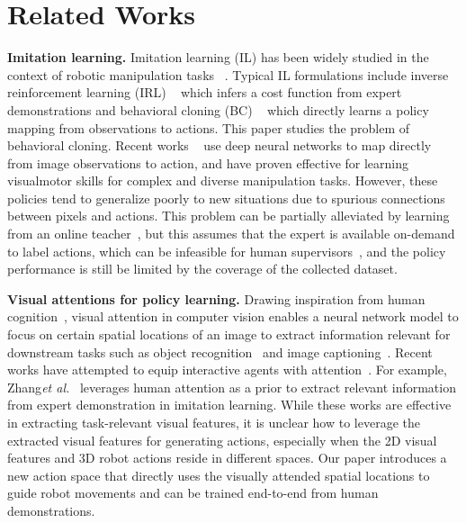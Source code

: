 \documentclass[letterpaper, 10 pt, conference]{ieeeconf}
\newcommand{\etal}{\xspace\emph{et al.}\xspace}
\begin{document}
\section{Related Works}

\textbf{Imitation learning.}
Imitation learning (IL) has been widely studied in the context of robotic manipulation tasks ~\cite{Ijspeert2002MovementIW, Schaal1999IsIL, Billard2008RobotPB, Calinon2010LearningAR, englert2018learning}. Typical IL formulations include inverse reinforcement learning (IRL) ~\cite{russell1998learning} which infers a cost function from expert demonstrations and behavioral cloning (BC) ~\cite{bain1995framework} which directly learns a policy mapping from observations to actions. This paper studies the problem of behavioral cloning. Recent works ~\cite{pomerleau1989alvinn, deep_imitation, Finn2017OneShotVI, mandlekar2020gti} use deep neural networks to map directly from image observations to action, and have proven effective for learning visualmotor skills for complex and diverse manipulation tasks. However, these policies tend to generalize poorly to new situations due to spurious connections between pixels and actions. This problem can be partially alleviated by learning from an online teacher~\cite{Ross2010ARO}, but this assumes that the expert is available on-demand to label actions, which can be infeasible for human supervisors~\cite{laskey2017comparing}, and the policy performance is still be limited by the coverage of the collected dataset.

\textbf{Visual attentions for policy learning.}
Drawing inspiration from human cognition~\cite{johansson2001eye,bowman2009eye,rothkopf2007task}, visual attention in computer vision enables a neural network model to focus on certain spatial locations of an image to extract information relevant for downstream tasks such as object recognition~\cite{mnih2014recurrent} and image captioning~\cite{xu2015show}. Recent works have attempted to equip interactive agents with attention~\cite{mott2019towards,attentionagent2020,zhangvisual,manchin2019reinforcement}. For example, Zhang\etal~\cite{zhangvisual} leverages human attention as a prior to extract relevant information from expert demonstration in imitation learning. While these works are effective in extracting task-relevant visual features, it is unclear how to leverage the extracted visual features for generating actions, especially when the 2D visual features and 3D robot actions reside in different spaces. Our paper introduces a new action space that directly uses the visually attended spatial locations to guide robot movements and can be trained end-to-end from human demonstrations. 
\end{document}

